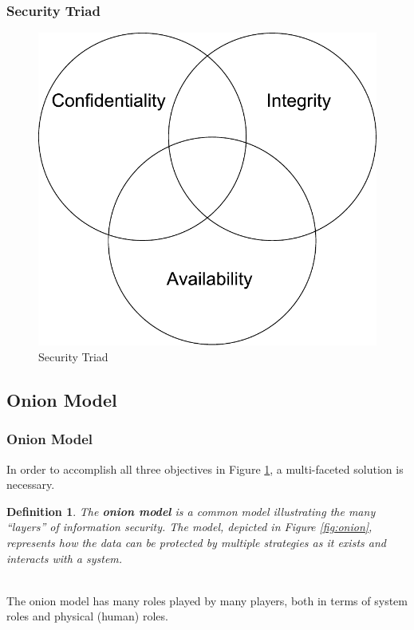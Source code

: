 \documentclass[aspectratio=169]{beamer}
\newtheorem{defn}{Definition}
\begin{document}
\begin{frame}
\frametitle{Security Triad}
\begin{figure}
\includegraphics[scale=0.45]{../artifacts/cia.pdf}
\caption{Security Triad}
\label{fig:cia}
\end{figure}
\end{frame}

\subsection{Onion Model}
\begin{frame}
\frametitle{Onion Model}
In order to accomplish all three objectives in Figure \ref{fig:cia}, a multi-faceted solution is necessary.
\pause
\begin{defn}
The \textbf{onion model} is a common model illustrating the many ``layers'' of information security. The model, depicted in Figure \ref{fig:onion}, represents how the data can be protected by multiple strategies as it exists and interacts with a system.
\end{defn}

\pause
\mbox{}\\
The onion model has many roles played by many players, both in terms of system roles and physical (human) roles.
\end{frame}
\end{document}
